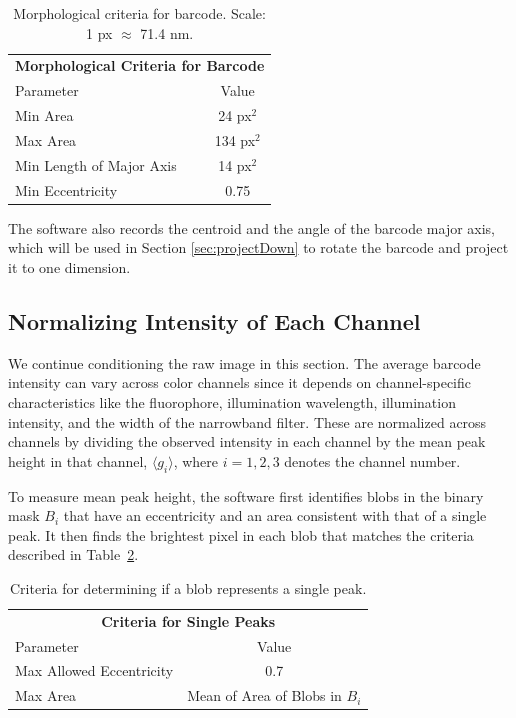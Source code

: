 \begin{table}[htbp] 
\begin{center}
\begin{tabular}{l c}
\multicolumn{2}{c}{\textbf{Morphological Criteria for Barcode}}\\
Parameter & Value \\
\hline
Min Area & 24 px$^2$ \\
Max Area & 134 px$^2$ \\
Min Length of Major Axis  & 14 px$^2$ \\
Min Eccentricity &0.75\\
\hline
\end{tabular}
\end{center}
\caption{Morphological criteria for barcode. Scale: 1 px $\approx$ 71.4 nm.\label{table:morphCriteria}}
\end{table}
The software also records the centroid and the angle of the barcode major axis, which will be used in Section \ref{sec:projectDown} to rotate the barcode and project it to one dimension. 



\subsection{Normalizing Intensity of Each Channel}\label{sec:normalizePeakHeight}
We continue conditioning the raw image in this section. The average barcode intensity can vary across color channels since it depends on  channel-specific characteristics like the fluorophore, illumination wavelength, illumination intensity, and the width of the narrowband filter. These are normalized across channels by dividing the observed intensity in each channel by the mean peak height in that channel,  $\langle g_i \rangle$, where $i=1,2,3$ denotes the channel number. 

To measure mean peak height, the software first identifies blobs in the binary mask $B_i$ that have an eccentricity and an area consistent with that of a single peak. It then finds the brightest pixel in each blob that matches the criteria described in Table~\ref{table:singlePeak}.

\begin{table}[htbp] 	
\begin{center}
\begin{tabular}{l c}
\multicolumn{2}{c}{\textbf{Criteria for Single Peaks}}\\
Parameter & Value \\
\hline
Max Allowed Eccentricity  & 0.7 \\
Max Area &  Mean of Area of Blobs in $B_i$ \\
\hline
\end{tabular}
\caption{Criteria for determining if a blob represents a single peak. \label{table:singlePeak}}
\end{center}
\end{table}

